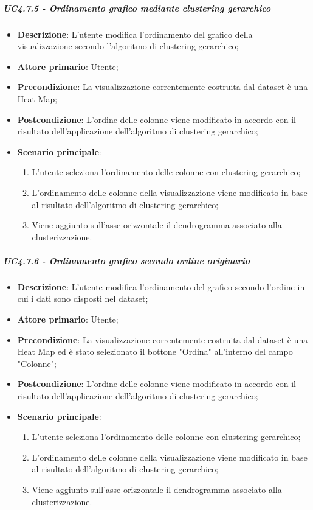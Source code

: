 \subparagraph{UC4.7.5 - Ordinamento grafico mediante clustering gerarchico}
\label{spar:uc4.7.5.6}
\begin{itemize}
    \item \textbf{Descrizione}:     L'utente modifica l'ordinamento del grafico  della visualizzazione secondo l'algoritmo di clustering gerarchico;
    \item \textbf{Attore primario}: Utente;
    \item \textbf{Precondizione}:   La visualizzazione correntemente costruita dal dataset è una Heat Map;
    \item \textbf{Postcondizione}:  L'ordine delle colonne viene modificato in accordo con il risultato dell'applicazione dell'algoritmo di clustering gerarchico;
    \item \textbf{Scenario principale}:
    \begin{enumerate}
        \item L'utente seleziona l'ordinamento delle colonne con clustering gerarchico;
        \item L'ordinamento delle colonne della visualizzazione viene modificato in base al risultato dell'algoritmo di clustering gerarchico;
        \item Viene aggiunto sull'asse orizzontale il dendrogramma associato alla clusterizzazione.
    \end{enumerate}
\end{itemize}

\subparagraph{UC4.7.6 - Ordinamento grafico secondo ordine originario }
\label{spar:uc4.7.5.7}
\begin{itemize}
    \item \textbf{Descrizione}:     L'utente modifica l'ordinamento del grafico secondo l'ordine in cui i dati sono disposti nel dataset;
    \item \textbf{Attore primario}: Utente;
    \item \textbf{Precondizione}:   La visualizzazione correntemente costruita dal dataset è una Heat Map ed è stato selezionato il bottone "Ordina" all'interno del campo "Colonne";
    \item \textbf{Postcondizione}:  L'ordine delle colonne viene modificato in accordo con il risultato dell'applicazione dell'algoritmo di clustering gerarchico;
    \item \textbf{Scenario principale}:
    \begin{enumerate}
        \item L'utente seleziona l'ordinamento delle colonne con clustering gerarchico;
        \item L'ordinamento delle colonne della visualizzazione viene modificato in base al risultato dell'algoritmo di clustering gerarchico;
        \item Viene aggiunto sull'asse orizzontale il dendrogramma associato alla clusterizzazione.
    \end{enumerate}
\end{itemize}



